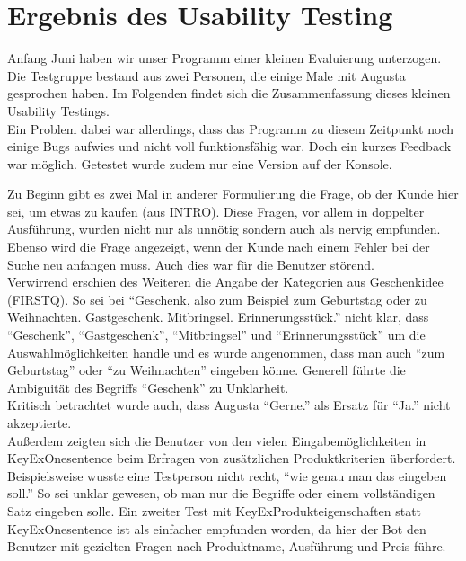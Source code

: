 \chapter{Ergebnis des Usability Testing}
\label{sec:UsabilityTesting}

Anfang Juni haben wir unser Programm einer kleinen Evaluierung unterzogen. Die Testgruppe bestand aus zwei Personen, die einige Male mit Augusta gesprochen haben. Im Folgenden findet sich die Zusammenfassung dieses kleinen Usability Testings.\\
Ein Problem dabei war allerdings, dass das Programm zu diesem Zeitpunkt noch einige Bugs aufwies und nicht voll funktionsfähig war. Doch ein kurzes Feedback war möglich. Getestet wurde zudem nur eine Version auf der Konsole.
\vspace{10pt}


Zu Beginn gibt es zwei Mal in anderer Formulierung die Frage, ob der Kunde hier sei, um etwas zu kaufen (aus INTRO). Diese Fragen, vor allem in doppelter Ausführung, wurden nicht nur als unnötig sondern auch als nervig empfunden. Ebenso wird die Frage angezeigt, wenn der Kunde nach einem Fehler bei der Suche neu anfangen muss. Auch dies war für die Benutzer störend. \\
Verwirrend erschien des Weiteren die Angabe der Kategorien aus Geschenkidee (FIRSTQ). So sei bei "`Geschenk, also zum Beispiel zum Geburtstag oder zu Weihnachten. Gastgeschenk. Mitbringsel. Erinnerungsstück."' nicht klar, dass "`Geschenk"', "`Gastgeschenk"', "`Mitbringsel"' und "`Erinnerungsstück"' um die Auswahlmöglichkeiten handle und es wurde angenommen, dass man auch "`zum Geburtstag"' oder "`zu Weihnachten"' eingeben könne. Generell führte die Ambiguität des Begriffs "`Geschenk"' zu Unklarheit.\\
Kritisch betrachtet wurde auch, dass Augusta "`Gerne."' als Ersatz für "`Ja."' nicht akzeptierte.\\
Außerdem zeigten sich die Benutzer von den vielen Eingabemöglichkeiten in KeyExOnesentence beim Erfragen von zusätzlichen Produktkriterien überfordert. Beispielsweise wusste eine Testperson nicht recht, "`wie genau man das eingeben soll."' So sei unklar gewesen, ob man nur die Begriffe oder einem vollständigen Satz eingeben solle. Ein zweiter Test mit KeyExProdukteigenschaften statt KeyExOnesentence ist als einfacher empfunden worden, da hier der Bot den Benutzer mit gezielten Fragen nach Produktname, Ausführung und Preis führe.
\vspace{10pt}


